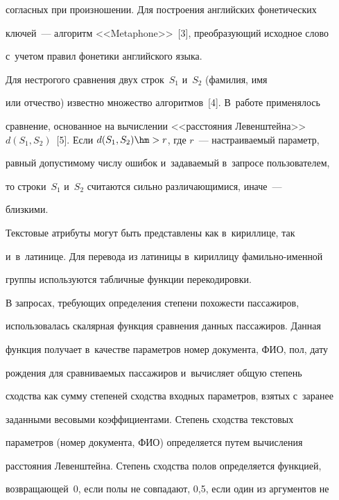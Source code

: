 согласных при произношении. Для построения английских фонетических 


ключей~--- алгоритм <<Metaphone>>~[3], преобразующий исходное слово 


с~учетом правил фонетики английского языка.


      


      Для нестрогого сравнения двух строк~$S_1$ и~$S_2$ (фамилия, имя 


или отчество) известно множество алгоритмов~[4]. В~работе применялось 


сравнение, основанное на вычислении <<расстояния Левенштейна>> $d(S_1, 


S_2)$~[5]. Если $d(S_1, S_2)\hm>r$, где $r$~--- настраиваемый параметр, 


равный допустимому числу ошибок и~задаваемый в~запросе пользователем, 


то строки~$S_1$ и~$S_2$ считаются сильно различающимися, иначе~--- 


близкими.


      


      Текстовые атрибуты могут быть представлены как в~кириллице, так 


      и~в~латинице. Для перевода из латиницы в~кириллицу фамильно-именной 


группы используются табличные функции перекодировки.


      


      В запросах, требующих определения степени похожести пассажиров, 


использовалась скалярная функция сравнения данных пассажиров. Данная 


функция получает в~качестве параметров номер документа, ФИО, пол, дату 


рождения для сравниваемых пассажиров и~вычисляет общую степень 


сходства как сумму степеней сходства входных параметров, взятых с~заранее 


заданными весовыми коэффициентами. Степень сходства текстовых 


параметров (номер документа, ФИО) определяется путем вычисления 


расстояния Левенштейна. Степень сходства полов определяется функцией, 


возвращающей~0, если полы не совпадают, 0,5, если один из аргументов не 


